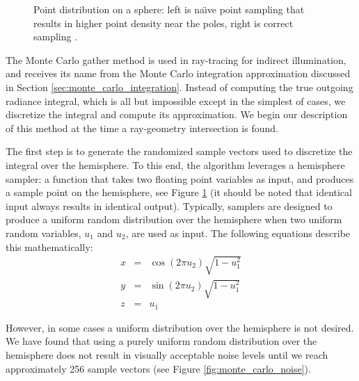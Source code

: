 \begin{figure}
    \centering
    \caption[Sphere Point Distribution]{Point distribution on a sphere: left is na\"{\i}ve point sampling that results in higher point density near the poles, right is correct sampling \cite{bib:point_sampling_wa}.}
    \label{fig:sphere_sampling}
\end{figure}

The Monte Carlo gather method is used in ray-tracing for indirect illumination, and receives its name from the Monte Carlo integration approximation discussed in Section \ref{sec:monte_carlo_integration}. Instead of computing the true outgoing radiance integral, which is all but impossible except in the simplest of cases, we discretize the integral and compute its approximation. We begin our description of this method at the time a ray-geometry intersection is found.

The first step is to generate the randomized sample vectors used to discretize the integral over the hemisphere. To this end, the algorithm leverages a hemisphere sampler: a function that takes two floating point variables as input, and produces a sample point on the hemisphere, see Figure \ref{fig:sphere_sampling} (it should be noted that identical input always results in identical output). Typically, samplers are designed to produce a uniform random distribution over the hemisphere when two uniform random variables, $u_{1}$ and $u_{2}$, are used as input. The following equations \cite{bib:pbr} describe this mathematically:
\begin{eqnarray}
x &=& \cos (2 \pi u_{2}) \sqrt{1-u_{1}^{2}} \nonumber \\
y &=& \sin (2 \pi u_{2}) \sqrt{1-u_{1}^{2}} \nonumber \\
z &=& u_{1}
\label{eqn:uniform_hemisphere}
\end{eqnarray}

However, in some cases a uniform distribution over the hemisphere is not desired. We have found that using a purely uniform random distribution over the hemisphere does not result in visually acceptable noise levels until we reach approximately 256 sample vectors (see Figure \ref{fig:monte_carlo_noise}).

